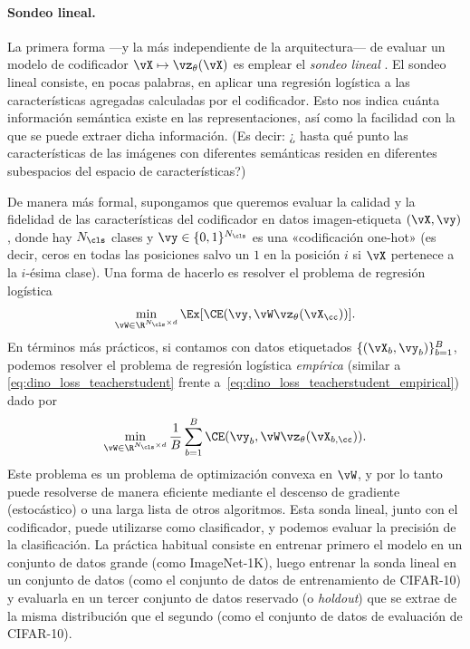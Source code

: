 \documentclass[../../book-main_es.tex]{subfiles}
\begin{document}
\paragraph{Sondeo lineal.}

La primera forma ---y la más independiente de la arquitectura--- de evaluar un modelo de codificador
\(\vX \mapsto \vz_{\theta}(\vX)\) es emplear el \textit{sondeo lineal
}. El sondeo lineal consiste, en pocas palabras, en aplicar una regresión logística
a las características agregadas calculadas por el codificador. Esto
nos indica cuánta información semántica existe en las representaciones,
así como la facilidad con la que se puede extraer dicha información. (Es decir: ¿
hasta qué punto las características de las imágenes con diferentes semánticas residen
en diferentes subespacios del espacio de características?)

De manera más formal, supongamos que queremos evaluar la calidad
y la fidelidad de las características del codificador en datos imagen-etiqueta
\((\vX, \vy)\), donde hay \(N_{\cls}\) clases y \(\vy \in
\{0, 1\}^{N_{\cls}}\) es una «codificación one-hot» (es decir, ceros en todas las
posiciones salvo un \(1\) en la posición \(i\) si \(\vX\) pertenece a la
\(i\)-ésima clase). Una forma de hacerlo es resolver el problema de regresión logística
\begin{equation}\label{eq:linear_probing}
\min_{\vW \in \R^{N_{\cls} \times d}}\Ex[\CE(\vy, \vW \vz_{\theta}(\vX_{\cc}))].
\end{equation}
En términos más prácticos, si contamos con datos etiquetados \(\{(\vX_{b}, \vy_{b})\}_{b
= 1}^{B}\), podemos resolver el problema de regresión logística \textit{empírica}
(similar a \eqref{eq:dino_loss_teacherstudent}
frente a~\eqref{eq:dino_loss_teacherstudent_empirical}) dado por
\begin{equation}\label{eq:linear_probing_empirical}
\min_{\vW \in \R^{N_{\cls} \times d}}\frac{1}{B}\sum_{b =
1}^{B}\CE(\vy_{b}, \vW \vz_{\theta}(\vX_{b, \cc})).
\end{equation}
Este problema es un problema de optimización convexa en \(\vW\), y por lo tanto
puede resolverse de manera eficiente mediante el descenso de gradiente (estocástico) o una
larga lista de otros algoritmos. Esta sonda lineal, junto con el
codificador, puede utilizarse como clasificador, y podemos evaluar la
precisión de la clasificación. La práctica habitual consiste en entrenar primero el modelo
en un conjunto de datos grande (como ImageNet-1K), luego entrenar la
sonda lineal en un conjunto de datos (como el conjunto de datos de entrenamiento de CIFAR-10) y
evaluarla en un tercer conjunto de datos reservado (o \textit{holdout}) que se extrae de la
misma distribución que el segundo (como el conjunto de datos de evaluación
de CIFAR-10).
\end{document}
